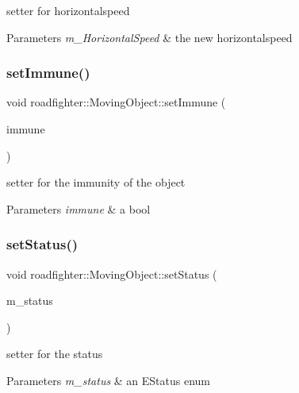 setter for horizontalspeed 
\begin{DoxyParams}{Parameters}
{\em m\+\_\+\+Horizontal\+Speed} & the new horizontalspeed \\
\hline
\end{DoxyParams}
\mbox{\label{classroadfighter_1_1MovingObject_a4b37b0c2ab03b681e9515db6f029186f}} 
\subsubsection{\texorpdfstring{set\+Immune()}{setImmune()}}
{\footnotesize\ttfamily void roadfighter\+::\+Moving\+Object\+::set\+Immune (\begin{DoxyParamCaption}\item[{bool}]{immune }\end{DoxyParamCaption})}

setter for the immunity of the object 
\begin{DoxyParams}{Parameters}
{\em immune} & a bool \\
\hline
\end{DoxyParams}
\mbox{\label{classroadfighter_1_1MovingObject_ab1f380b45e20697c45b6ed7b466ca0e9}} 
\subsubsection{\texorpdfstring{set\+Status()}{setStatus()}}
{\footnotesize\ttfamily void roadfighter\+::\+Moving\+Object\+::set\+Status (\begin{DoxyParamCaption}\item[{E\+Status}]{m\+\_\+status }\end{DoxyParamCaption})}

setter for the status 
\begin{DoxyParams}{Parameters}
{\em m\+\_\+status} & an E\+Status enum \\
\hline
\end{DoxyParams}
\mbox{\label{classroadfighter_1_1MovingObject_a3e0c64a4f67f03e84fc388127123c2df}} 
